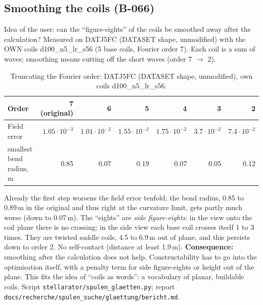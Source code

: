 \subsection{Smoothing the coils (B-066)}
Idea of the user: can the ``figure-eights'' of the coils be smoothed away after the calculation? Measured on DATJ5FC (DATASET shape, unmodified) with the OWN coils d100\_n5\_lr\_s56 (5 base coils, Fourier order 7). Each coil is a sum of waves; smoothing means cutting off the short waves (order 7 $\to$ 2).
\begin{table}[H]\centering\small
\begin{tabular}{lrrrrrr}\toprule
Order & 7 (original) & 6 & 5 & 4 & 3 & 2 \\\midrule
Field error & $1.05\cdot10^{-3}$ & $1.01\cdot10^{-2}$ & $1.55\cdot10^{-2}$ & $1.75\cdot10^{-2}$ & $3.7\cdot10^{-2}$ & $7.4\cdot10^{-2}$ \\
smallest bend radius, m & 0.85 & 0.07 & 0.19 & 0.07 & 0.05 & 0.12 \\\bottomrule
\end{tabular}\caption{Truncating the Fourier order: DATJ5FC (DATASET shape, unmodified), own coils d100\_n5\_lr\_s56.}\end{table}
Already the first step worsens the field error tenfold; the bend radius, 0.85 to 0.89\,m in the original and thus right at the curvature limit, gets partly much worse (down to 0.07\,m).
The ``eights'' are \emph{side figure-eights}: in the view onto the coil plane there is no crossing; in the side view each base coil crosses itself 1 to 3 times. They are twisted saddle coils, 4.5 to 6.9\,m out of plane, and this persists down to order 2. No self-contact (distance at least 1.9\,m).
\textbf{Consequence:} smoothing after the calculation does not help. Constructability has to go into the optimisation itself, with a penalty term for side figure-eights or height out of the plane. This fits the idea of ``coils as words'': a vocabulary of planar, buildable coils. Script \texttt{stellarator/spulen\_glaetten.py}; report \texttt{docs/recherche/\allowbreak spulen\_suche/\allowbreak glaettung/\allowbreak bericht.md}.

